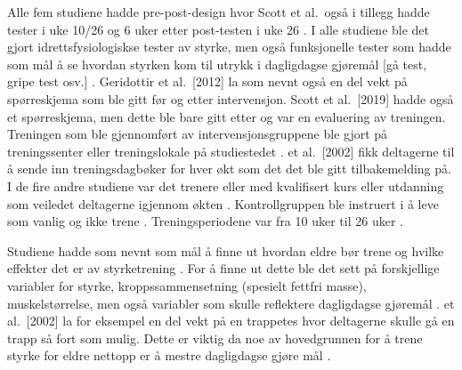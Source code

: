 \documentclass[
]{book}
\begin{document}
Alle fem studiene hadde pre-post-design hvor Scott et al.~også i tillegg hadde tester i uke 10/26 og 6 uker etter post-testen i uke 26 \citetext{\citealp[ et al.~2012]{Geirsdottir}; \citealp[Johnen, and Holfelder 2019]{Schott}; \citealp[ et al.~2017]{Turpela}; \citealp[ et al.~2019]{vikberg}; \citealp[ et al.~2002]{vincent}}.
I alle studiene ble det gjort idrettsfysiologiskse tester av styrke, men også funksjonelle tester som hadde som mål å se hvordan styrken kom til utrykk i dagligdagse gjøremål {[}gå test, gripe test osv.{]} \citetext{\citealp[ et al.~2012]{Geirsdottir}; \citealp[Johnen, and Holfelder 2019]{Schott}; \citealp[ et al.~2017]{Turpela}; \citealp[ et al.~2019]{vikberg}; \citealp[ et al.~2002]{vincent}}.
Geridottir et al.~{[}2012{]} la som nevnt også en del vekt på spørreskjema som ble gitt før og etter intervensjon.
Scott et al.~{[}2019{]} hadde også et spørreskjema, men dette ble bare gitt etter og var en evaluering av treningen.
Treningen som ble gjennomført av intervensjonsgruppene ble gjort på treningssenter eller treningslokale på studiestedet \citetext{\citealp[ et al.~2012]{Geirsdottir}; \citealp[Johnen, and Holfelder 2019]{Schott}; \citealp[ et al.~2017]{Turpela}; \citealp[ et al.~2019]{vikberg}; \citealp[ et al.~2002]{vincent}}.
\citet{vincent} et al.~{[}2002{]} fikk deltagerne til å sende inn treningsdagbøker for hver økt som det det ble gitt tilbakemelding på.
I de fire andre studiene var det trenere eller med kvalifisert kurs eller utdanning som veiledet deltagerne igjennom økten \citetext{\citealp[ et al.~2012]{Geirsdottir}; \citealp[Johnen, and Holfelder 2019]{Schott}; \citealp[ et al.~2017]{Turpela}; \citealp[ et al.~2019]{vikberg}}.
Kontrollgruppen ble instruert i å leve som vanlig og ikke trene \citetext{\citealp[Johnen, and Holfelder 2019]{Schott}; \citealp[ et al.~2017]{Turpela}; \citealp[ et al.~2019]{vikberg}; \citealp[ et al.~2002]{vincent}}.
Treningsperiodene var fra 10 uker til 26 uker \citetext{\citealp[ et al.~2012]{Geirsdottir}; \citealp[Johnen, and Holfelder \href{mailto:2019;@Turpela}{\nolinkurl{2019;@Turpela}} et al.~2017]{Schott}; \citealp[ et al.~2019]{vikberg}; \citealp[ et al.~2002]{vincent}}.

Studiene hadde som nevnt som mål å finne ut hvordan eldre bør trene og hvilke effekter det er av styrketrening \citetext{\citealp[ et al.~2012]{Geirsdottir}; \citealp[Johnen, and Holfelder 2019]{Schott}; \citealp[ et al.~2017]{Turpela}; \citealp[ et al.~2019]{vikberg}; \citealp[ et al.~2002]{vincent}}.
For å finne ut dette ble det sett på forskjellige variabler for styrke, kroppssammensetning (spesielt fettfri masse), muskelstørrelse, men også variabler som skulle reflektere dagligdagse gjøremål \citetext{\citealp[ et al.~2012]{Geirsdottir}; \citealp[Johnen, and Holfelder 2019]{Schott}; \citealp[ et al.~2017]{Turpela}; \citealp[ et al.~2019]{vikberg}; \citealp[ et al.~2002]{vincent}}.
\citet{vincent} et al.~{[}2002{]} la for eksempel en del vekt på en trappetes hvor deltagerne skulle gå en trapp så fort som mulig.
Dette er viktig da noe av hovedgrunnen for å trene styrke for eldre nettopp er å mestre dagligdagse gjøre mål \citep[ et al.~2002]{vincent}.
\end{document}
